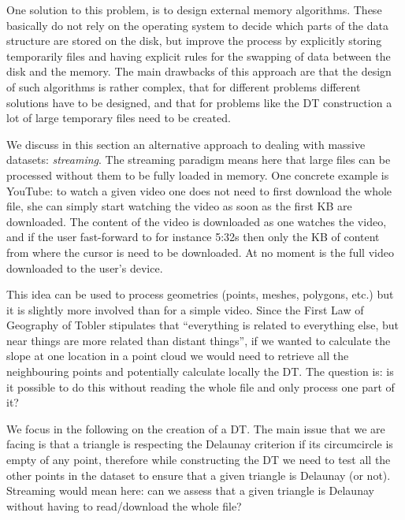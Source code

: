 One solution to this problem, is to design external memory algorithms.%
These basically do not rely on the operating system to decide which parts of the data structure are stored on the disk, but improve the process by explicitly storing temporarily files and having explicit rules for the swapping of data between the disk and the memory. 
The main drawbacks of this approach are that the design of such algorithms is rather complex, that for different problems different solutions have to be designed, and that for problems like the DT construction a lot of large temporary files need to be created.

%

We discuss in this section an alternative approach to dealing with massive datasets: \emph{streaming}.%
The streaming paradigm means here that large files can be processed without them to be fully loaded in memory.
One concrete example is YouTube: to watch a given video one does not need to first download the whole file, she can simply start watching the video as soon as the first KB are downloaded.
The content of the video is downloaded as one watches the video, and if the user fast-forward to for instance 5:32s then only the KB of content from where the cursor is need to be downloaded.
At no moment is the full video downloaded to the user's device.

%

This idea can be used to process geometries (points, meshes, polygons, etc.) but it is slightly more involved than for a simple video.
Since the First Law of Geography of Tobler stipulates that ``everything is related to everything else, but near things are more related than distant things'', if we wanted to calculate the slope at one location in a point cloud we would need to retrieve all the neighbouring points and potentially calculate locally the DT\@.
The question is: is it possible to do this without reading the whole file and only process one part of it?

%

We focus in the following on the creation of a DT\@.
The main issue that we are facing is that a triangle is respecting the Delaunay criterion if its circumcircle is empty of any point, therefore while constructing the DT we need to test all the other points in the dataset to ensure that a given triangle is Delaunay (or not).
Streaming would mean here: can we assess that a given triangle is Delaunay without having to read/download the whole file?

